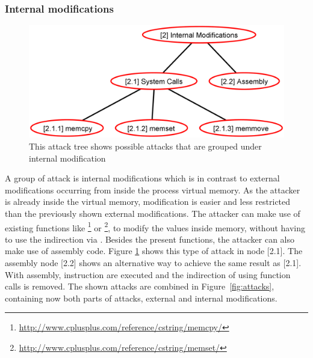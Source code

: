 \subsubsection{Internal modifications}
\label{sec:internal_modifications}
\begin{figure}[h]
\centering
\includegraphics[width=.75\textwidth, keepaspectratio]{sections/adtrees/InternalModificationsWithoutDefenses.png}
\caption{This attack tree shows possible attacks that are grouped under internal modification}
\label{fig:attacks_internal}
\end{figure}
A group of attack is internal modifications which is in contrast to external modifications occurring from inside the process virtual memory. As the attacker is already inside the virtual memory, modification is easier and less restricted than the previously shown external modifications. The attacker can make use of existing functions like \footnote{\url{http://www.cplusplus.com/reference/cstring/memcpy/}} or \footnote{\url{http://www.cplusplus.com/reference/cstring/memset/}}, to modify the values inside memory, without having to use the indirection via . Besides the present  functions, the attacker can also make use of assembly code. Figure \ref{fig:attacks_internal} shows this type of attack in node [2.1]. The assembly node [2.2] shows an alternative way to achieve the same result as [2.1]. With assembly, instruction are executed and the indirection of using function calls is removed. The shown attacks are combined in Figure~\ref{fig:attacks}, containing now both parts of attacks, external and internal modifications.